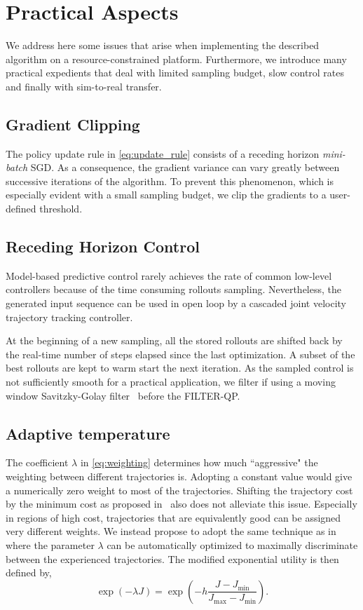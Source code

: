 \section{Practical Aspects}

We address here some issues that arise when implementing the described algorithm on a resource-constrained platform. Furthermore, we introduce many practical expedients that deal with limited sampling budget, slow control rates and finally with sim-to-real transfer.  

\subsection{Gradient Clipping} 
The policy update rule in \eqn \ref{eq:update_rule} consists of a receding horizon \emph{mini-batch} SGD. As a consequence, the gradient variance can vary greatly between successive iterations of the algorithm. To prevent this phenomenon, which is especially evident with a small sampling budget, we clip the gradients to a user-defined threshold.  

\subsection{Receding Horizon Control} 
Model-based predictive control rarely achieves the rate of common low-level controllers because of the time consuming rollouts sampling. Nevertheless, the generated input sequence can be used in open loop by a cascaded joint velocity trajectory tracking controller. 

At the beginning of a new sampling, all the stored rollouts are shifted back by the real-time number of steps elapsed since the last optimization. A subset of the best rollouts are kept to warm start the next iteration. 
As the sampled control is not sufficiently smooth for a practical application, we filter if using a moving window Savitzky-Golay filter~\cite{gorry1990general} before the FILTER-QP. 

\subsection{Adaptive temperature} 
The coefficient $\lambda$ in \eqref{eq:weighting} determines how much ``aggressive" the weighting between different trajectories is. Adopting a constant value would give a numerically zero weight to most of the trajectories. Shifting the trajectory cost by the minimum cost as proposed in~\cite{williams_information_2017} also does not alleviate this issue. 
Especially in regions of high cost, trajectories that are equivalently good can be assigned very different weights. We instead propose to adopt the same technique as in~\cite{theodorou2010generalized} where the parameter $\lambda$ can be automatically optimized to maximally discriminate between the experienced trajectories. The modified exponential utility is then defined by,
\begin{equation} \label{eq:adaptive_t}
    \exp (-\lambda J ) = \exp \left( -h \frac{J - J_{\min}}{J_{\max} - J_{\min}} \right).
\end{equation}

